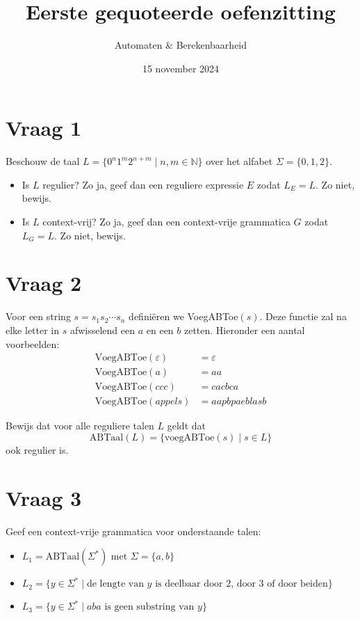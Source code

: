 \documentclass[kulak]{kulakarticle}
\title{Eerste gequoteerde oefenzitting}
\author{Automaten \& Berekenbaarheid}
\date{15 november 2024}
\newcommand{\N}{\mathbb{N}}
\let\epsilon\varepsilon
\theoremstyle{definition}
\begin{document}
	\maketitle

	\section*{Vraag 1}

	Beschouw de taal \( L = \{0^n1^m2^{n+m} \mid n,m \in \N \} \) over het alfabet \(\Sigma=\{0,1,2\}\).
	\begin{itemize}
		\item Is \(L\) regulier? Zo ja, geef dan een reguliere expressie \(E\) zodat \(L_E=L\). Zo niet, bewijs.
		\item Is \(L\) context-vrij? Zo ja, geef dan een context-vrije grammatica \(G\) zodat \(L_G=L\). Zo niet, bewijs.
	\end{itemize}

	\section*{Vraag 2}

	Voor een string \(s=s_1s_2\cdots s_n\) definiëren we VoegABToe\((s)\). Deze functie zal na elke letter in \(s\) afwisselend een \(a\) en een \(b\) zetten. Hieronder een aantal voorbeelden: \begin{align*}
		\text{VoegABToe}(\epsilon) &= \epsilon \\
		\text{VoegABToe}(a) &= aa \\
		\text{VoegABToe}(ccc) &= cacbca \\
		\text{VoegABToe}(appels) &= aapbpaeblasb
	\end{align*}

	Bewijs dat voor alle reguliere talen \(L\) geldt dat \[\text{ABTaal}(L) = \{ \text{voegABToe}(s) \mid s \in L \}\] ook regulier is.

	\section*{Vraag 3}

	Geef een context-vrije grammatica voor onderstaande talen:
	\begin{itemize}
		\item \(L_1 = \text{ABTaal}(\Sigma^*)\) met \(\Sigma = \{a,b\}\)
		\item \(L_2 = \{y \in \Sigma^* \mid \text{de lengte van $y$ is deelbaar door 2, door 3 of door beiden}\}\)
		\item \(L_3 = \{y \in \Sigma^* \mid \text{$aba$ is geen substring van } y \}\)
	\end{itemize}
\end{document}
